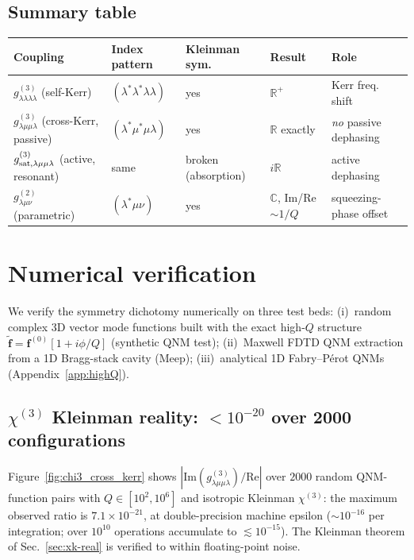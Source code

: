 \documentclass[11pt]{article}
\newcommand{\tf}{\tilde{\mathbf{f}}}
\begin{document}
\subsection{Summary table}

\begin{center}\small
\begin{tabular}{lllll}
\toprule
Coupling & Index pattern & Kleinman sym. & Result & Role\\
\midrule
$g^{(3)}_{\lambda\lambda\lambda\lambda}$ (self-Kerr) & $(\lambda^*\lambda^*\lambda\lambda)$ & yes & $\mathbb{R}^+$ & Kerr freq. shift\\
$g^{(3)}_{\lambda\mu\mu\lambda}$ (cross-Kerr, passive) & $(\lambda^*\mu^*\mu\lambda)$ & yes & $\mathbb{R}$ exactly & \emph{no} passive dephasing\\
$g^{(3)}_{\rm sat,\lambda\mu\mu\lambda}$ (active, resonant) & same & broken (absorption) & $i\mathbb{R}$ & active dephasing\\
$g^{(2)}_{\lambda\mu\nu}$ (parametric) & $(\lambda^*\mu\nu)$ & yes & $\mathbb{C}$, Im/Re$\sim 1/Q$ & squeezing-phase offset\\
\bottomrule
\end{tabular}
\end{center}

\section{Numerical verification}
\label{sec:numerics}

We verify the symmetry dichotomy numerically on three test beds: (i)~random
complex 3D vector mode functions built with the exact high-$Q$ structure
$\tf = \mathbf{f}^{(0)}[1+i\phi/Q]$ (synthetic QNM test);
(ii)~Maxwell FDTD QNM extraction from a 1D Bragg-stack cavity (Meep);
(iii)~analytical 1D Fabry--P\'erot QNMs (Appendix~\ref{app:highQ}).

\subsection{$\chi^{(3)}$ Kleinman reality: $<10^{-20}$ over 2000 configurations}

Figure~\ref{fig:chi3_cross_kerr} shows $|\mathrm{Im}(g^{(3)}_{\lambda\mu\mu\lambda})
/\mathrm{Re}|$ over $2000$ random QNM-function pairs with $Q\in[10^2,10^6]$
and isotropic Kleinman $\chi^{(3)}$: the maximum observed ratio is
$7.1\times 10^{-21}$, at double-precision machine epsilon
($\sim 10^{-16}$ per integration; over $10^{10}$ operations accumulate
to $\lesssim 10^{-15}$).  The Kleinman theorem of
Sec.~\ref{sec:xk-real} is verified to within floating-point noise.
\end{document}

